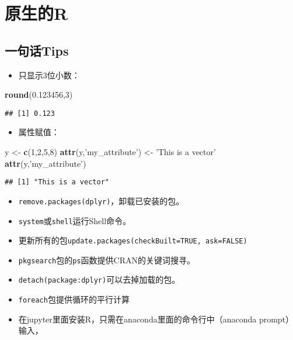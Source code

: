 \documentclass[
]{book}
\newenvironment{Shaded}{\begin{snugshade}}{\end{snugshade}}
\newcommand{\DecValTok}[1]{\textcolor[rgb]{0.00,0.00,0.81}{#1}}
\newcommand{\FloatTok}[1]{\textcolor[rgb]{0.00,0.00,0.81}{#1}}
\newcommand{\KeywordTok}[1]{\textcolor[rgb]{0.13,0.29,0.53}{\textbf{#1}}}
\newcommand{\NormalTok}[1]{#1}
\newcommand{\StringTok}[1]{\textcolor[rgb]{0.31,0.60,0.02}{#1}}
\providecommand{\tightlist}{%
  \setlength{\itemsep}{0pt}\setlength{\parskip}{0pt}}
\begin{document}
\hypertarget{rawR}{%
\chapter{原生的R}\label{rawR}}

\hypertarget{ux4e00ux53e5ux8bddtips-3}{%
\section{一句话Tips}\label{ux4e00ux53e5ux8bddtips-3}}

\begin{itemize}
\tightlist
\item
  只显示3位小数：
\end{itemize}

\begin{Shaded}
\begin{Highlighting}[]
\KeywordTok{round}\NormalTok{(}\FloatTok{0.123456}\NormalTok{,}\DecValTok{3}\NormalTok{)}
\end{Highlighting}
\end{Shaded}

\begin{verbatim}
## [1] 0.123
\end{verbatim}

\begin{itemize}
\tightlist
\item
  属性赋值：
\end{itemize}

\begin{Shaded}
\begin{Highlighting}[]
\NormalTok{y <-}\StringTok{ }\KeywordTok{c}\NormalTok{(}\DecValTok{1}\NormalTok{,}\DecValTok{2}\NormalTok{,}\DecValTok{5}\NormalTok{,}\DecValTok{8}\NormalTok{)}
\KeywordTok{attr}\NormalTok{(y,}\StringTok{'my_attribute'}\NormalTok{) <-}\StringTok{ 'This is a vector'}
\KeywordTok{attr}\NormalTok{(y,}\StringTok{'my_attribute'}\NormalTok{)}
\end{Highlighting}
\end{Shaded}

\begin{verbatim}
## [1] "This is a vector"
\end{verbatim}

\begin{itemize}
\tightlist
\item
  \texttt{remove.packages(\textquotesingle{}dplyr\textquotesingle{})}，卸载已安装的包。
\item
  \texttt{system}或\texttt{shell}运行Shell命令。
\item
  更新所有的包\texttt{update.packages(checkBuilt=TRUE,\ ask=FALSE)}
\item
  \texttt{pkgsearch}包的\texttt{ps}函数提供CRAN的关键词搜寻。
\item
  \texttt{detach(package:dplyr)}可以去掉加载的包。
\item
  \texttt{foreach}包提供循环的平行计算
\item
  在jupyter里面安装R，只需在anaconda里面的命令行中（anaconda prompt）输入，
\end{itemize}
\end{document}
